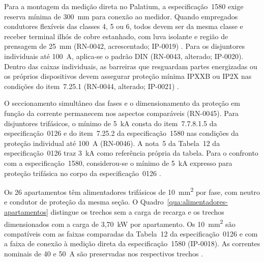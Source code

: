 Para a montagem da medição direta no Palatium, a especificação~1580 exige reserva mínima de 300~mm para conexão ao medidor. Quando empregados condutores flexíveis das classes 4, 5 ou 6, todos devem ser da mesma classe e receber terminal ilhós de cobre estanhado, com luva isolante e região de prensagem de 25~mm (RN-0042, acrescentado; IP-0019) \cite[item~7.17.1 e Desenho~10]{enel1580}. Para os disjuntores individuais até 100~A, aplica-se o padrão DIN (RN-0043, alterado; IP-0020). Dentro das caixas individuais, as barreiras que resguardam partes energizadas ou os próprios dispositivos devem assegurar proteção mínima IPXXB ou IP2X nas condições do item~7.25.1 (RN-0044, alterado; IP-0021) \cite[item~7.25.1]{enel1580}.

O seccionamento simultâneo das fases e o dimensionamento da proteção em função da corrente permanecem nos aspectos comparáveis (RN-0045). Para disjuntores trifásicos, o mínimo de 5~kA consta do item~7.7.8.1.5 da especificação~0126 e do item~7.25.2 da especificação~1580 nas condições da proteção individual até 100~A (RN-0046). A nota~5 da Tabela~12 da especificação~0126 traz 3~kA como referência própria da tabela. Para o confronto com a especificação~1580, considerou-se o mínimo de 5~kA expresso para proteção trifásica no corpo da especificação~0126 \cite[item~7.7.8.1.5 e tabela~12, nota~5]{enel0126}\cite[itens~7.25.1--7.25.2]{enel1580}.

Os 26 apartamentos têm alimentadores trifásicos de 10~mm\textsuperscript{2} por fase, com neutro e condutor de proteção da mesma seção. O Quadro~\ref{qua:alimentadores-apartamentos} distingue os trechos sem a carga de recarga e os trechos dimensionados com a carga de 3,70~kW por apartamento. Os 10~mm\textsuperscript{2} são compatíveis com as faixas comparadas da Tabela~12 da especificação~0126 e com a faixa de conexão à medição direta da especificação~1580 (IP-0018). As correntes nominais de 40 e 50~A são preservadas nos respectivos trechos \cite[p.~12--13]{palatiummemorial2025}\cite[tabela~12]{enel0126}\cite[item~7.17.1]{enel1580}.

